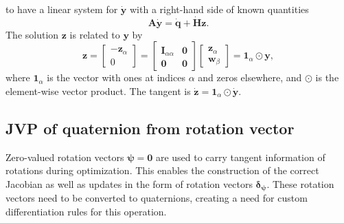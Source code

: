 \documentclass[preprint,12pt]{elsarticle}
\let\vec\bm
\let\mat\mathbf
\numberwithin{equation}{section}
\def\rv{\psi}
\begin{document}
to have a linear system for $\dot{\vec{y}}$ with a right-hand side of known quantities
\begin{equation}
   \mat{A} \dot{\vec{y}} = \dot{\vec{q}} + \dot{\mat{H}} \vec{z}.
\end{equation}
The solution $\vec{z}$ is related to $\vec{y}$ by
\begin{equation}
    \vec{z} =
    \begin{bmatrix}
        -\vec{z}_\alpha \\ 0
    \end{bmatrix}
    =
    \begin{bmatrix}
        \mat{I}_{\alpha\alpha} & \mat{0} \\
        \mat{0}                & \mat{0}
    \end{bmatrix}
    \begin{bmatrix}
        \vec{z}_\alpha \\ \vec{w}_\beta
    \end{bmatrix}
    =
    \vec{1}_\alpha \odot \vec{y},
\end{equation}
where $\vec{1}_\alpha$ is the vector with ones at indices $\alpha$ and zeros elsewhere, and $\odot$ is the element-wise vector product.
The tangent is $\dot{\vec{z}} = \vec{1}_\alpha \odot \dot{\vec{y}}$.

\subsection{JVP of quaternion from rotation vector}
\label{appendix:jvp_quaternion_from_rotation_vector}
\def\rv{\psi}
Zero-valued rotation vectors $\vec{\psi}=\vec{0}$ are used to carry tangent information of rotations during optimization. 
This enables the construction of the correct Jacobian as well as updates in the form of rotation vectors $\vec{\delta}_{\vec{\psi}}$.
These rotation vectors need to be converted to quaternions, creating a need for custom differentiation rules for this operation.
\end{document}
